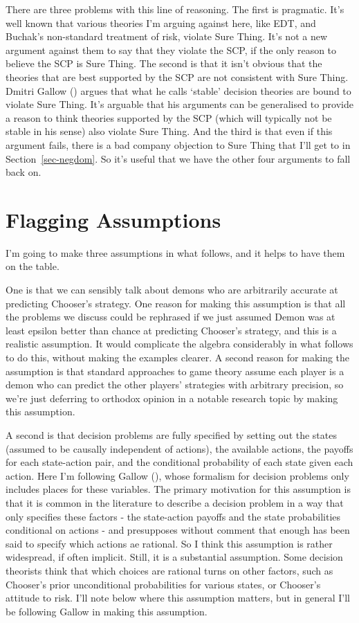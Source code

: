 \documentclass[
  10pt,
  letterpaper,
  DIV=11,
  numbers=noendperiod,
  twoside]{scrartcl}
\begin{document}
There are three problems with this line of reasoning. The first is
pragmatic. It's well known that various theories I'm arguing against
here, like EDT, and Buchak's non-standard treatment of risk, violate
Sure Thing. It's not a new argument against them to say that they
violate the SCP, if the only reason to believe the SCP is Sure Thing.
The second is that it isn't obvious that the theories that are best
supported by the SCP are not consistent with Sure Thing. Dmitri Gallow
() argues that what he calls `stable'
decision theories are bound to violate Sure Thing. It's arguable that
his arguments can be generalised to provide a reason to think theories
supported by the SCP (which will typically not be stable in his sense)
also violate Sure Thing. And the third is that even if this argument
fails, there is a bad company objection to Sure Thing that I'll get to
in Section~\ref{sec-negdom}. So it's useful that we have the other four
arguments to fall back on.

\section{Flagging Assumptions}\label{sec-flagging}

I'm going to make three assumptions in what follows, and it helps to
have them on the table.

One is that we can sensibly talk about demons who are arbitrarily
accurate at predicting Chooser's strategy. One reason for making this
assumption is that all the problems we discuss could be rephrased if we
just assumed Demon was at least epsilon better than chance at predicting
Chooser's strategy, and this is a realistic assumption. It would
complicate the algebra considerably in what follows to do this, without
making the examples clearer. A second reason for making the assumption
is that standard approaches to game theory assume each player is a demon
who can predict the other players' strategies with arbitrary precision,
so we're just deferring to orthodox opinion in a notable research topic
by making this assumption.

A second is that decision problems are fully specified by setting out
the states (assumed to be causally independent of actions), the
available actions, the payoffs for each state-action pair, and the
conditional probability of each state given each action. Here I'm
following Gallow (), whose formalism for
decision problems only includes places for these variables. The primary
motivation for this assumption is that it is common in the literature to
describe a decision problem in a way that only specifies these factors -
the state-action payoffs and the state probabilities conditional on
actions - and presupposes without comment that enough has been said to
specify which actions ae rational. So I think this assumption is rather
widespread, if often implicit. Still, it is a substantial assumption.
Some decision theorists think that which choices are rational turns on
other factors, such as Chooser's prior unconditional probabilities for
various states, or Chooser's attitude to risk. I'll note below where
this assumption matters, but in general I'll be following Gallow in
making this assumption.
\end{document}
